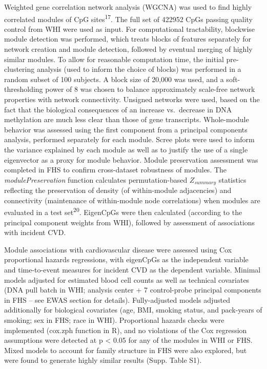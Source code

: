 \documentclass[]{article}
\theoremstyle{definition}
\theoremstyle{definition}
\theoremstyle{definition}
\theoremstyle{remark}
\begin{document}
Weighted gene correlation network analysis (WGCNA) was used to find
highly correlated modules of CpG sites\textsuperscript{17}. The full set
of 422952 CpGs passing quality control from WHI were used as input. For
computational tractability, blockwise module detection was performed,
which treats blocks of features separately for network creation and
module detection, followed by eventual merging of highly similar
modules. To allow for reasonable computation time, the initial
pre-clustering analysis (used to inform the choice of blocks) was
performed in a random subset of 100 subjects. A block size of 20,000 was
used, and a soft-thresholding power of 8 was chosen to balance
approximately scale-free network properties with network connectivity.
Unsigned networks were used, based on the fact that the biological
consequences of an increase vs.~decrease in DNA methylation are much
less clear than those of gene transcripts. Whole-module behavior was
assessed using the first component from a principal components analysis,
performed separately for each module. Scree plots were used to inform
the variance explained by each module as well as to justify the use of a
single eigenvector as a proxy for module behavior. Module preservation
assessment was completed in FHS to confirm cross-dataset robustness of
modules. The \emph{modulePreservation} function calculates
permutation-based \(Z_{summary}\) statistics reflecting the preservation
of density (of within-module adjacencies) and connectivity (maintenance
of within-module node correlations) when modules are evaluated in a test
set\textsuperscript{20}. EigenCpGs were then calculated (according to
the principal component weights from WHI), followed by assessment of
associations with incident CVD.

Module associations with cardiovascular disease were assessed using Cox
proportional hazards regressions, with eigenCpGs as the independent
variable and time-to-event measures for incident CVD as the dependent
variable. Minimal models adjusted for estimated blood cell counts as
well as technical covariates (DNA pull batch in WHI; analysis center + 7
control-probe principal components in FHS -- see EWAS section for
details). Fully-adjusted models adjusted additionally for biological
covariates (age, BMI, smoking status, and pack-years of smoking; sex in
FHS; race in WHI). Proportional hazards checks were implemented (cox.zph
function in R), and no violations of the Cox regression assumptions were
detected at p \textless{} 0.05 for any of the modules in WHI or FHS.
Mixed models to account for family structure in FHS were also explored,
but were found to generate highly similar results (Supp. Table S1).
\end{document}
